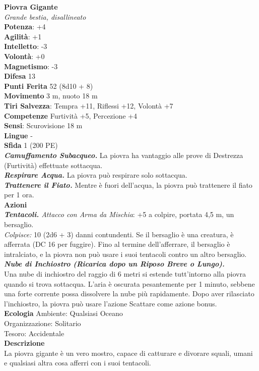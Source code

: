\begin{multicols}{2}
\medskip\textbf{Piovra Gigante}\\
\emph{Grande bestia, disallineato}\\
\textbf{Potenza}: +4\\
\textbf{Agilità}: +1\\
\textbf{Intelletto}: -3\\
\textbf{Volontà}: +0\\
\textbf{Magnetismo}: -3\\
\textbf{Difesa} 13\\
\textbf{Punti Ferita} 52 (8d10 + 8)\\
\textbf{Movimento} 3 m, nuoto 18 m\\
\textbf{Tiri Salvezza}: Tempra +11, Riflessi +12, Volontà +7 \\
\textbf{Competenze} Furtività +5, Percezione +4\\
\textbf{Sensi}: Scurovisione 18 m\\
\textbf{Lingue} -\\
\textbf{Sfida} 1 (200 PE)\smallskip\\
\emph{\textbf{Camuffamento Subacqueo.}} La piovra ha vantaggio alle prove di Destrezza (Furtività) effettuate sottacqua.\\
\emph{\textbf{Respirare Acqua.}} La piovra può respirare solo sottacqua.\\
\emph{\textbf{Trattenere il Fiato.}} Mentre è fuori dell'acqua, la piovra può trattenere il fiato per 1 ora.\\
\smallskip\textbf{Azioni}\\
\emph{\textbf{Tentacoli.} Attacco con Arma da Mischia}: +5 a colpire, portata 4,5 m, un bersaglio.\\
\emph{Colpisce:} 10 (2d6 + 3) danni contundenti. Se il bersaglio è una creatura, è afferrata (DC 16 per fuggire). Fino al termine dell'afferrare, il bersaglio è intralciato, e la piovra non può usare i suoi tentacoli contro un altro bersaglio.\\
\emph{\textbf{Nube di Inchiostro (Ricarica dopo un Riposo Breve o Lungo).}}\\
Una nube di inchiostro del raggio di 6 metri si estende tutt'intorno alla piovra quando si trova sottacqua. L'aria è oscurata pesantemente per 1 minuto, sebbene una forte corrente  possa dissolvere la nube più rapidamente. Dopo aver rilasciato  l'inchiostro, la piovra può usare l'azione Scattare come azione bonus. \\
\textbf{Ecologia}
Ambiente: Qualsiasi Oceano\\
Organizzazione: Solitario\\
Tesoro: Accidentale\\
\textbf{Descrizione}\\
La piovra gigante è un vero mostro, capace di catturare e divorare squali, umani e qualsiasi altra cosa afferri con i suoi tentacoli. \\


\end{multicols}
